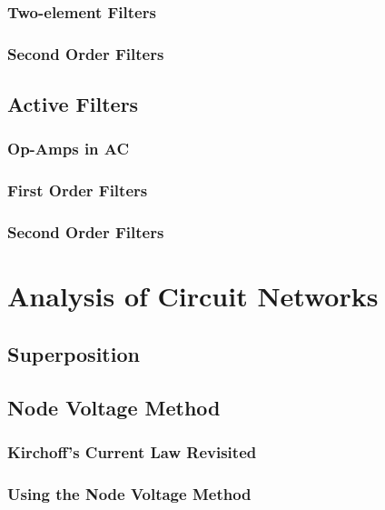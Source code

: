 \documentclass[a4paper,11pt]{book}
\begin{document}
\section{Two-element Filters}

\section{Second Order Filters}


\chapter{Active Filters}
\section{Op-Amps in AC}

\section{First Order Filters}

\section{Second Order Filters}


\part{Analysis of Circuit Networks}
\chapter{Superposition}

\chapter{Node Voltage Method}
\section{Kirchoff's Current Law Revisited}
\section{Using the Node Voltage Method}
\end{document}

